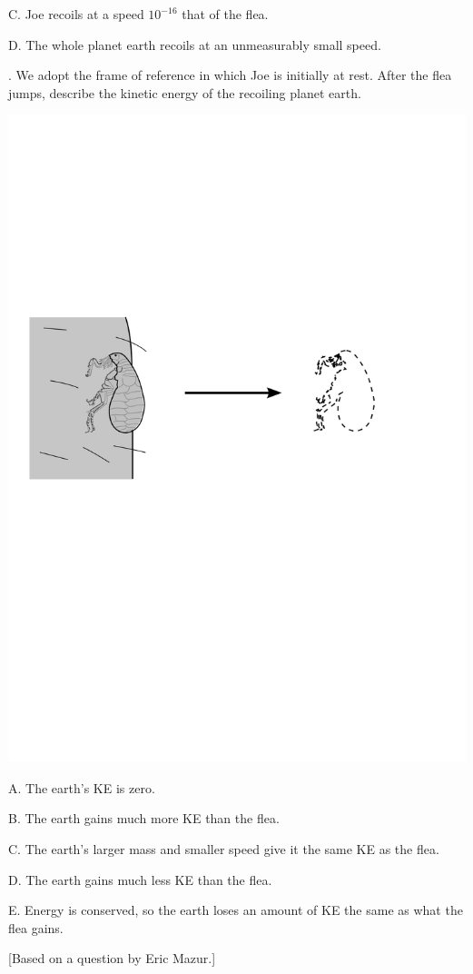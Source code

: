 \documentclass[20pt]{extarticle}
\begin{document}
C. Joe recoils at a speed $10^{-16}$ that of the flea.

D. The whole planet earth recoils at an unmeasurably small speed.

\pagebreak


. We adopt the frame
of reference in which Joe is initially at rest.
After the flea jumps, describe the kinetic
energy of the recoiling planet earth.

\includegraphics{figs/flea}

A. The earth's KE is zero.

B. The earth gains much more KE than the flea.

C. The earth's larger mass and smaller speed give it the same KE as the flea.

D. The earth gains much less KE than the flea.

E. Energy is conserved, so the earth loses an amount of KE the same as what the flea gains.

{\tiny [Based on a question by Eric Mazur.]}

\pagebreak

\end{document}
